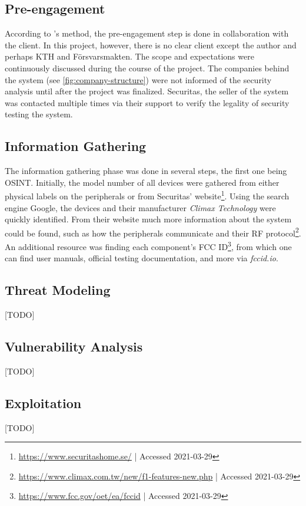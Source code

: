 \subsection{Pre-engagement}
According to \citeauthor{weidman2014}'s method, the pre-engagement step is done in collaboration with the client. In this project, however, there is no clear client except the author and perhaps KTH and Försvarsmakten. The scope and expectations were continuously discussed during the course of the project. The companies behind the system (see \ref{fig:company-structure}) were not informed of the security analysis until after the project was finalized. Securitas, the seller of the system was contacted multiple times via their support to verify the legality of security testing the system.

\subsection{Information Gathering}
The information gathering phase was done in several steps, the first one being \gls{OSINT}. Initially, the model number of all devices were gathered from either physical labels on the peripherals or from Securitas' website\footnote{\url{https://www.securitashome.se/} | Accessed 2021-03-29}. Using the search engine Google, the devices and their manufacturer \textit{Climax Technology} were quickly identified. From their website much more information about the system could be found, such as how the peripherals communicate and their \gls{RF} protocol\footnote{\url{https://www.climax.com.tw/new/f1-features-new.php} | Accessed 2021-03-29}. An additional resource was finding each component's FCC ID\footnote{\url{https://www.fcc.gov/oet/ea/fccid} | Accessed 2021-03-29}, from which one can find user manuals, official testing documentation, and more via \textit{fccid.io}.

\subsection{Threat Modeling} \label{ch:method:threat-modeling}
[TODO]

\subsection{Vulnerability Analysis}
[TODO]

\subsection{Exploitation}
[TODO]

